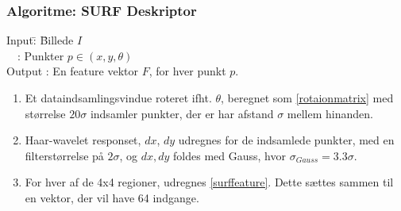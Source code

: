 \subsubsection*{Algoritme: SURF Deskriptor}
\begin{tabbing}
Input\quad \= : \= Billede $I$\\
$\text{ }$ \> : \> Punkter $p \in (x, y, \theta)$ \\
Output \text{ } \> : \> En feature vektor $F$, for hver punkt $p$.
\end{tabbing}
\begin{enumerate}
\item Et dataindsamlingsvindue roteret ifht. $\theta$, beregnet som \eqref{rotaionmatrix} med størrelse $20\sigma$ indsamler punkter, der er har afstand $\sigma$ mellem hinanden.
\item Haar-wavelet responset, $dx$, $dy$ udregnes for de indsamlede punkter, med en filterstørrelse på $2\sigma$, og $dx, dy$ foldes med Gauss, hvor $\sigma_{Gauss} = 3.3\sigma$.
\item For hver af de 4x4 regioner, udregnes \eqref{surffeature}. Dette sættes sammen til en vektor, der vil have 64 indgange.
\end{enumerate}